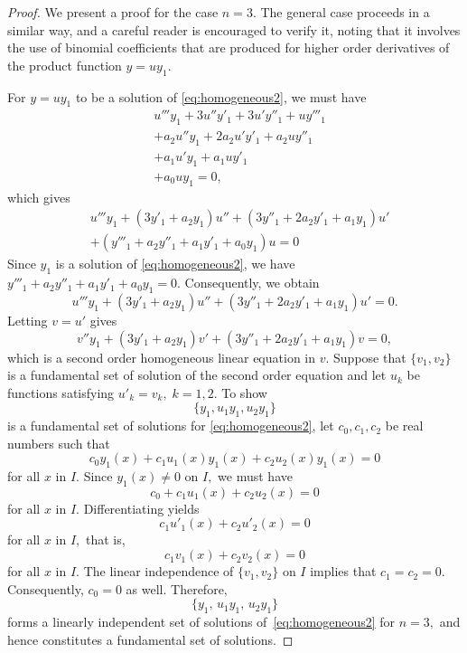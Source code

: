 \begin{proof}
	We present a proof for the case $n=3.$ The general case proceeds in a similar way, and a careful reader is encouraged to verify it, noting that it involves the use of binomial coefficients that are produced for higher order derivatives of the product function $ y= u y_1.$ 
	
	For $y= uy_1$ to be a solution of \eqref{eq:homogeneous2}, we must have
	\begin{equation*}
		\begin{split}
		&u'''y_1+ 3u''y'_1+ 3u'y''_1 + uy'''_1\\
		&+a_2 u''y_1+2a_2 u'y'_1+a_2uy''_1\\
		&+a_1u'y_1+a_1uy'_1\\
		&+a_0uy_1 =0,
		\end{split}
	\end{equation*}
	which gives
	\[\begin{split}
		&u'''y_1+ (3y'_1+a_2y_1) u''+ (3y''_1+2a_2y'_1+a_1y_1)u'\\
		&+ (y'''_1+a_2y''_1+a_1y'_1+a_0y_1)u=0
	\end{split}\]
	Since $y_1$ is a solution of  \eqref{eq:homogeneous2},  we have \(y'''_1+a_2y''_1+a_1y'_1+a_0y_1=0.\) Consequently, we obtain
	\[u'''y_1+ (3y'_1+a_2y_1) u''+ (3y''_1+2a_2y'_1+a_1y_1)u'=0.\]
	Letting  $v= u'$ gives
		\[v''y_1+ (3y'_1+a_2y_1) v'+ (3y''_1+2a_2y'_1+a_1y_1)v=0,\]
which is a second order  homogeneous linear equation in $v.$ Suppose that $\{v_1, v_2\}$ is a fundamental set of solution of the second order equation and let $u_k$ be functions satisfying $u'_k = v_k,\; k = 1, 2.$
 To show
\[\{y_1, u_1y_1, u_2y_1 \}\] is a fundamental set of solutions for  \eqref{eq:homogeneous2}, 
let $c_0, c_1, c_2$ be real numbers such that 
\[c_0y_1(x) +c_1u_1(x) y_1(x) + c_2 u_2(x) y_1(x) = 0\] for all $x$ in $I.$ Since $y_1(x) \ne 0$ on $I,$ we must have
\[c_0 +c_1u_1(x) + c_2 u_2(x)  = 0\] for all $x$ in $I.$ Differentiating yields
\[c_1u'_1(x) + c_2u'_2(x)  = 0\] for all $x$ in $I,$ 
that is,
\[c_1v_1(x) + c_2v_2(x)  = 0\] for all $x$ in $I.$  
The linear independence of $\{v_1, v_2\}$ on $I$ implies that $c_1 = c_2 = 0.$ 
Consequently, $c_0 = 0$ as well. Therefore,
\[
\{y_1,\, u_1 y_1,\, u_2 y_1\}
\]
forms a linearly independent set of solutions of~\eqref{eq:homogeneous2} for $n = 3,$ 
and hence constitutes a fundamental set of solutions.
\end{proof}

